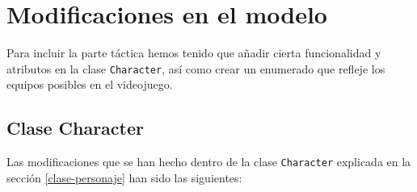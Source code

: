 \medskip
\section{Modificaciones en el modelo}
Para incluir la parte táctica hemos tenido que añadir cierta funcionalidad y atributos en la clase \texttt{Character}, así como crear un enumerado que refleje los equipos posibles en el videojuego. 

\medskip
\subsection{Clase Character}
Las modificaciones que se han hecho dentro de la clase \texttt{Character} explicada en la sección \ref{clase-personaje} han sido las siguientes:

